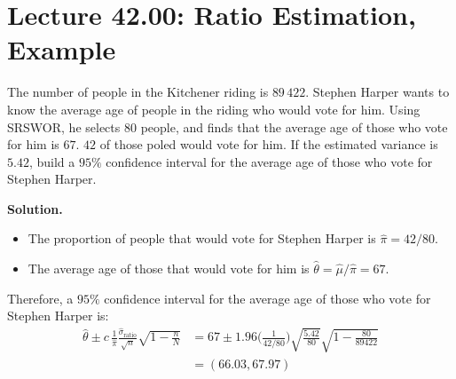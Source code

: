 \section{Lecture 42.00: Ratio Estimation, Example}
\begin{Example}{}{}
    The number of people in the Kitchener riding is
    $89\,422$. Stephen Harper wants to know the average age
    of people in the riding who would vote for him. Using SRSWOR,
    he selects $80$ people, and finds that the average age of those
    who vote for him is $67$. $42$ of those poled would vote for him.
    If the estimated variance is $5.42$, build a $95\%$ confidence interval
    for the average age of those who vote for Stephen Harper.

    \textbf{Solution.}
    \begin{itemize}
        \item The proportion of people that
              would vote for Stephen Harper is $ \hat{\pi}=42/80 $.
        \item The average age of those that would vote for him is
              $ \hat{\theta}=\hat{\mu}/\hat{\pi}=67 $.
    \end{itemize}
    Therefore, a $95\%$ confidence interval for the average age of those who
    vote for Stephen Harper is:
    \begin{align*}
        \hat{\theta}\pm c\, \frac{1}{\hat{\pi}} \frac{\hat{\sigma}_{\text{ratio}}}{\sqrt{n}}\sqrt{1-\frac{n}{N}}
         & =67\pm 1.96\biggl(\frac{1}{42/80}\biggr) \sqrt{\frac{5.42}{80}} \sqrt{1-\frac{80}{89422}} \\
         & =(66.03,67.97)
    \end{align*}
\end{Example}
